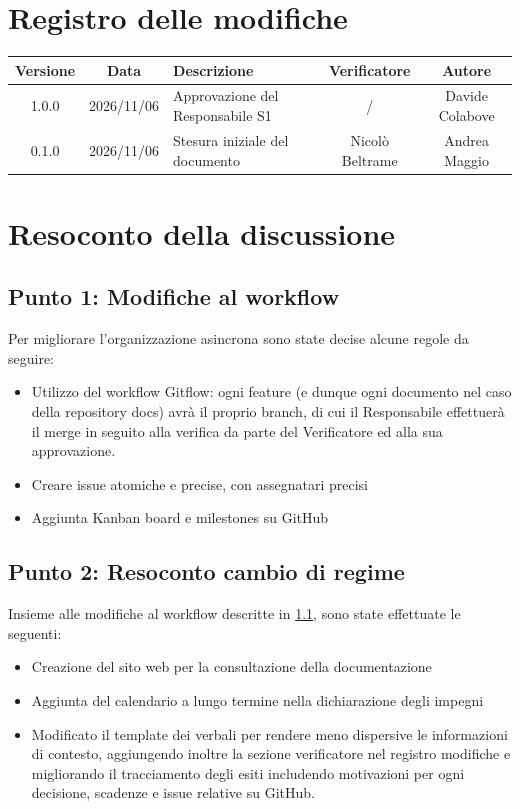 \documentclass[a4paper, 11pt]{article}
\begin{document}
\section*{Registro delle modifiche}
\begin{tabularx}{\textwidth}{|c|c|X|c|c|}
    \hline
    \textbf{Versione} & \textbf{Data} & \textbf{Descrizione} & \textbf{Verificatore} & \textbf{Autore} \\ \hline
    1.0.0 & 2026/11/06 & Approvazione del Responsabile S1 & / & Davide Colabove \\ \hline
    0.1.0 & 2026/11/06 & Stesura iniziale del documento & Nicolò Beltrame & Andrea Maggio \\ \hline
\end{tabularx}

\newpage
\tableofcontents
\newpage


\section{Resoconto della discussione}

\subsection{Punto 1: Modifiche al workflow} \label{PuntoUno}
Per migliorare l'organizzazione asincrona sono state decise alcune regole da seguire:
\begin{itemize}
    \item Utilizzo del workflow Gitflow: ogni feature (e dunque ogni documento nel caso della repository docs) avrà il proprio branch, di cui il Responsabile effettuerà il merge in seguito alla verifica da parte del Verificatore ed alla sua approvazione. \vspace{-0.2cm}
    \item Creare issue atomiche e precise, con assegnatari precisi\vspace{-0.2cm}
    \item Aggiunta Kanban board e milestones su GitHub
\end{itemize}
\subsection{Punto 2: Resoconto cambio di regime}
Insieme alle modifiche al workflow descritte in \ref{PuntoUno}, sono state effettuate le seguenti:
\begin{itemize}
    \item Creazione del sito web per la consultazione della documentazione\vspace{-0.2cm}
    \item Aggiunta del calendario a lungo termine nella dichiarazione degli impegni\vspace{-0.2cm}
    \item Modificato il template dei verbali per rendere meno dispersive le informazioni di contesto, aggiungendo inoltre la sezione verificatore nel registro modifiche e migliorando il tracciamento degli esiti includendo motivazioni per ogni decisione, scadenze e issue relative su GitHub.
\end{itemize}
\end{document}
